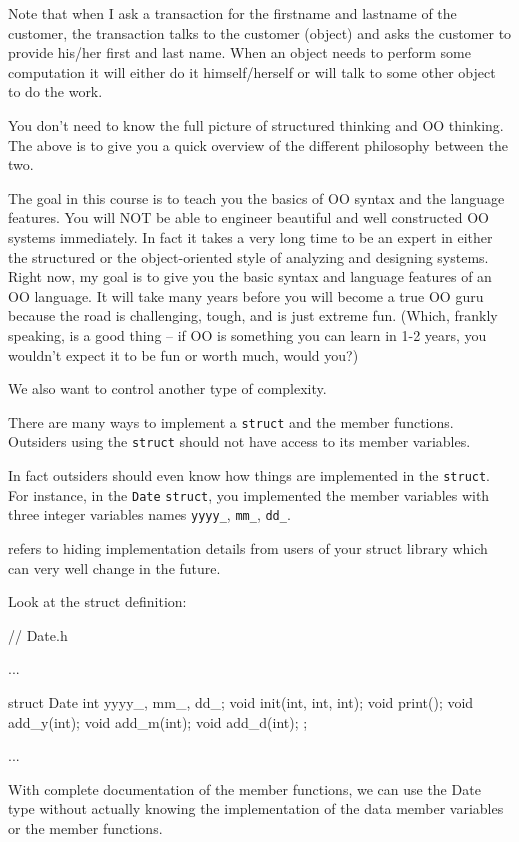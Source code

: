 Note that when I ask a transaction for the firstname and lastname of the
customer, the transaction talks to the customer (object) and asks the
customer to provide his/her first and last name. When an object needs to
perform some computation it will either do it himself/herself or will talk to
some other object to do the work.

You don't need to know the full picture of structured thinking and OO
thinking. The above is to give you a quick overview of the different
philosophy between the two.

The goal in this course is to teach you the basics of OO syntax and the
language features. You will NOT be able to engineer beautiful and well
constructed OO systems immediately. In fact it takes a very long time to
be an expert in either the structured or the object-oriented style of
analyzing and designing systems. Right now, my goal is to give you the
basic syntax and language features of an OO language. It will take many
years before you will become a true OO guru because the road is
challenging, tough, and is just extreme fun. (Which, frankly speaking, is a
good thing -- if OO is something you can learn in 1-2 years, you wouldn't
expect it to be fun or worth much, would you?)


\newpage{}

We also want to control another type of complexity.

There are many ways to implement a \texttt{struct} and the member functions. Outsiders using the \texttt{struct} should not have access to its member variables.

In fact outsiders should  even know how things are implemented in the \texttt{struct}. For instance, in the \texttt{Date} \texttt{struct}, you implemented the member variables with three integer variables names \texttt{yyyy\_}, \texttt{mm\_}, \texttt{dd\_}.

 refers to hiding implementation details from users of your struct library which can very well change in the future.

Look at the struct definition:

\begin{consolethree}
// Date.h

...

struct Date
{
    int yyyy_, mm_, dd_;
    void init(int, int, int);
    void print();
    void add_y(int);
    void add_m(int);
    void add_d(int);
};

...
\end{consolethree}
With complete documentation of the member functions, we can use the Date type without actually knowing the implementation of the data member variables or the member functions.

